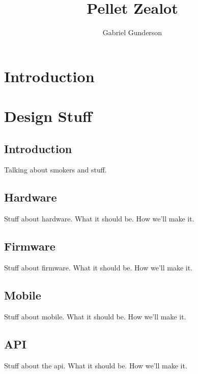 \documentclass[12pt, oneside]{article}
\title{Pellet Zealot}
\author{Gabriel Gunderson}
\begin{document}
\maketitle

\tableofcontents

\section{Introduction}

\section{Design Stuff}

\subsection*{Introduction}

Talking about smokers and stuff.

\subsection*{Hardware}

Stuff about hardware. What it should be. How we'll make it.

\subsection*{Firmware}

Stuff about firmware. What it should be. How we'll make it.

\subsection*{Mobile}

Stuff about mobile. What it should be. How we'll make it.

\subsection*{API}

Stuff about the api. What it should be. How we'll make it.
\end{document}
